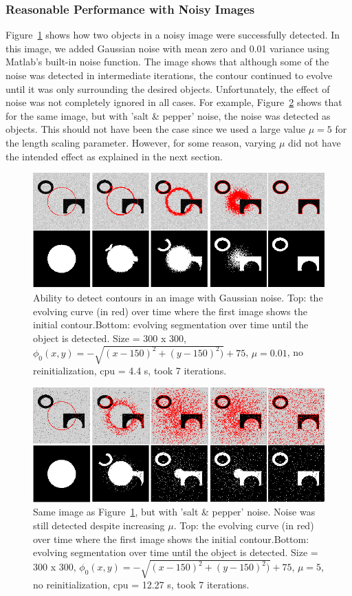 \documentclass[10pt,twocolumn,letterpaper]{article}
\begin{document}
\subsubsection*{Reasonable Performance with Noisy Images}

Figure~\ref{fig:cv_eg10} shows how two objects in a noisy image were successfully detected. In this image, we added Gaussian noise with mean zero and 0.01
variance using Matlab's built-in noise function. The image shows that although some of the noise was detected in intermediate iterations, the contour continued
to evolve until it was only surrounding the desired objects. Unfortunately, the effect of noise was not completely ignored in all cases. For example,
Figure~\ref{fig:cv_eg11} shows that for the same image, but with 'salt \& pepper' noise, the noise was detected as objects. This should not have been the case
since we used a large value $\mu = 5$ for the length scaling parameter. However, for some reason, varying $\mu$ did not have the intended effect as explained
in the next section. 

\begin{figure}[t]
\centering
\includegraphics[width=12cm]{cv_eg10.png}
\caption{Ability to detect contours in an image with Gaussian noise.  Top: the evolving curve (in red) over time where the first
image shows the initial
contour.Bottom: evolving segmentation over time until the object is detected. Size = 300 x 300, $\phi_{0}(x,y) = - \sqrt{(x - 150)^2 + (y - 150)^2)} +
75$, $\mu =0.01$, no reinitialization, cpu = 4.4 s, took 7 iterations.}
\label{fig:cv_eg10}
\end{figure}

\begin{figure}[t]
\centering
\includegraphics[width=12cm]{cv_eg11.png}
\caption{Same image as Figure~\ref{fig:cv_eg10}, but with 'salt \& pepper' noise. Noise was still detected despite increasing $\mu$.  Top: the evolving curve
(in red) over time where the first
image shows the initial
contour.Bottom: evolving segmentation over time until the object is detected. Size = 300 x 300, $\phi_{0}(x,y) = - \sqrt{(x - 150)^2 + (y - 150)^2)} +
75$, $\mu = 5$, no reinitialization, cpu = 12.27 s, took 7 iterations.}
\label{fig:cv_eg11}
\end{figure}
\end{document}
